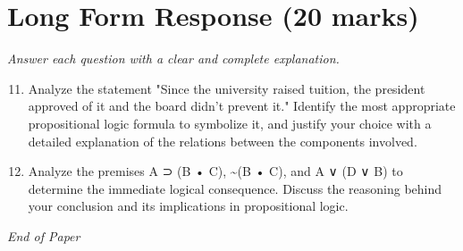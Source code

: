 \documentclass[12pt]{article}
\begin{document}
\section*{Long Form Response (20 marks)}
\textit{Answer each question with a clear and complete explanation.}
\begin{enumerate}[label=\arabic*.]
\setcounter{enumi}{10}
\item Analyze the statement "Since the university raised tuition, the president approved of it and the board didn't prevent it." Identify the most appropriate propositional logic formula to symbolize it, and justify your choice with a detailed explanation of the relations between the components involved.
\item Analyze the premises A ⊃ (B • C), \textasciitilde{}(B • C), and A ∨ (D ∨ B) to determine the immediate logical consequence. Discuss the reasoning behind your conclusion and its implications in propositional logic.
\end{enumerate}

\vfill
\noindent\textit{End of Paper}
\end{document}
